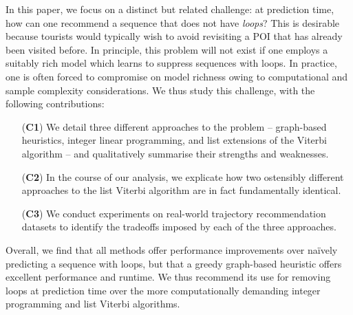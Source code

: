 In this paper, we focus on a distinct but related challenge:
at prediction time, how can one recommend a sequence that does not have \emph{loops}?
This is desirable because tourists would typically wish to avoid revisiting a POI that has already been visited before.
In principle, this problem will not exist if one employs a suitably rich model which learns to suppress sequences with loops.
In practice, one is often forced to compromise on model richness owing to computational and sample complexity considerations.
We thus study this challenge, with the following contributions:
\begin{enumerate}
	\item[(\textbf{C1})] We detail three different approaches to the problem -- 
	graph-based heuristics,
	integer linear programming,
	and
	list extensions of the Viterbi algorithm
	-- and qualitatively summarise their strengths and weaknesses.
	\item[(\textbf{C2})] In the course of our analysis, we explicate how two ostensibly different approaches to the list Viterbi algorithm \citep{seshadri1994list,nilsson2001sequentially} are in fact fundamentally identical.
	\item[(\textbf{C3})] We conduct experiments on real-world trajectory recommendation datasets to identify the tradeoffs imposed by each of the three approaches.
\end{enumerate}
Overall, we find that
all methods offer performance improvements over na\"{i}vely predicting a sequence with loops,
but that
a greedy graph-based heuristic offers excellent performance and runtime.
We thus recommend its use
for removing loops at prediction time
over the more computationally demanding integer programming and list Viterbi algorithms. 

